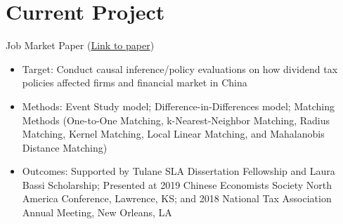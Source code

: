 \documentclass{resume}
\begin{document}
\section{Current Project}
Job Market Paper (\href{https://liberalarts.tulane.edu/sites/liberalarts.tulane.edu/files/sites/default/files/Xie%20JMP_0.pdf}{Link to paper})
\begin{itemize}
  \item Target: Conduct causal inference/policy evaluations on how dividend tax policies affected firms and financial market in China 
  \item Methods: Event Study model; Difference-in-Differences model; Matching Methods (One-to-One Matching, k-Nearest-Neighbor Matching, Radius Matching, Kernel Matching, Local Linear Matching, and Mahalanobis Distance Matching)
  \item Outcomes: Supported by Tulane SLA Dissertation Fellowship and Laura Bassi Scholarship; Presented at 2019 Chinese Economists Society North America Conference, Lawrence, KS; and 2018 National Tax Association Annual Meeting, New Orleans, LA
\end{itemize}
\end{document}
